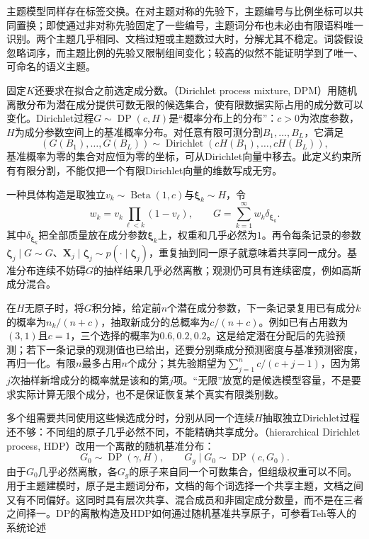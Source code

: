 主题模型同样存在标签交换。在对主题对称的先验下，主题编号与比例坐标可以共同置换；即使通过非对称先验固定了一些编号，主题词分布也未必由有限语料唯一识别。两个主题几乎相同、文档过短或主题数过大时，分解尤其不稳定。词袋假设忽略词序，而主题比例的先验又限制组间变化；较高的似然不能证明学到了唯一、可命名的语义主题。

固定$K$还要求在拟合之前选定成分数。（Dirichlet process mixture, DPM）用随机离散分布为潜在成分提供可数无限的候选集合，使有限数据实际占用的成分数可以变化。Dirichlet过程$G\sim\operatorname{DP}(c,H)$是“概率分布上的分布”：$c>0$为浓度参数，$H$为成分参数空间上的基准概率分布。对任意有限可测分割$B_1,\ldots,B_L$，它满足
\[
  (G(B_1),\ldots,G(B_L))
     \sim\operatorname{Dirichlet}
       (cH(B_1),\ldots,cH(B_L)),
\]
基准概率为零的集合对应恒为零的坐标，可从Dirichlet向量中移去。此定义约束所有有限分割，不能仅把一个有限Dirichlet向量的维数写成无穷。

一种具体构造是取独立$v_k\sim\operatorname{Beta}(1,c)$与$\bm{\xi}_k\sim H$，令
\[
  w_k=v_k\prod_{\ell<k}(1-v_\ell),\qquad
  G=\sum_{k=1}^{\infty}w_k\delta_{\bm{\xi}_k}.
\]
其中$\delta_{\bm{\xi}_k}$把全部质量放在成分参数$\bm{\xi}_k$上，权重和几乎必然为$1$。再令每条记录的参数$\bm{\zeta}_j\mid G\sim G$、$\bm{X}_j\mid\bm{\zeta}_j\sim p(\cdot\mid\bm{\zeta}_j)$，重复抽到同一原子就意味着共享同一成分。基准分布连续不妨碍$G$的抽样结果几乎必然离散；观测仍可具有连续密度，例如高斯成分混合。

在$H$无原子时，将$G$积分掉，给定前$n$个潜在成分参数，下一条记录复用已有成分$k$的概率为$n_k/(n+c)$，抽取新成分的总概率为$c/(n+c)$。例如已有占用数为$(3,1)$且$c=1$，三个选择的概率为$0.6,0.2,0.2$。这是给定潜在分配后的先验预测；若下一条记录的观测值也已给出，还要分别乘成分预测密度与基准预测密度，再归一化。有限$n$最多占用$n$个成分；其先验期望为$\sum_{j=1}^{n}c/(c+j-1)$，因为第$j$次抽样新增成分的概率就是该和的第$j$项。“无限”放宽的是候选模型容量，不是要求实际计算无限个成分，也不是保证恢复某个真实有限类别数。

多个组需要共同使用这些候选成分时，分别从同一个连续$H$抽取独立Dirichlet过程还不够：不同组的原子几乎必然不同，不能精确共享成分。（hierarchical Dirichlet process, HDP）改用一个离散的随机基准分布：
\begin{equation}
  \label{eq:pgm-static-directed-hdp}
  G_0\sim\operatorname{DP}(\gamma,H),\qquad
  G_g\mid G_0\sim\operatorname{DP}(c,G_0).
\end{equation}
由于$G_0$几乎必然离散，各$G_g$的原子来自同一个可数集合，但组级权重可以不同。用于主题建模时，原子是主题词分布，文档的每个词选择一个共享主题，文档之间又有不同偏好。这同时具有层次共享、混合成员和非固定成分数量，而不是在三者之间择一。DP的离散构造及HDP如何通过随机基准共享原子，可参看Teh等人的系统论述

